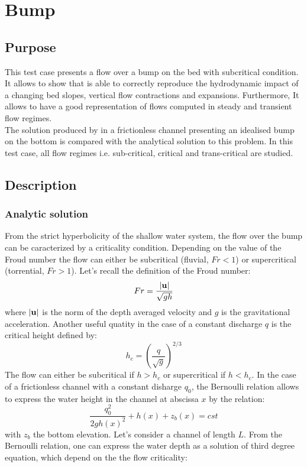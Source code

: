 \chapter{Bump}\label{chapter:bump}

\section{Purpose}

This test case presents a flow over a bump on the bed with subcritical condition.
It allows to show that  is able to correctly reproduce
the hydrodynamic impact of a changing bed slopes, vertical flow
contractions and expansions. Furthermore, It allows to have a good
representation of flows computed in steady and transient flow regimes. \\

The solution produced by  in a frictionless channel
presenting an idealised bump on the bottom  is compared with
the analytical solution to this problem. In this test case,
all flow regimes i.e. sub-critical, critical and trans-critical are studied.

\section{Description}

\subsection{Analytic solution}

From the strict hyperbolicity of the shallow water system, the flow over the bump can be caracterized by a
criticality condition. Depending on the value of the Froud number 
the flow can either be subcritical (fluvial, $Fr<1$) 
or supercritical (torrential, $Fr>1$).
Let's recall the definition of the Froud number:
\begin{equation}
Fr = \dfrac{|{\bf u}|}{\sqrt{gh}}
\end{equation}
where $|{\bf u}|$ is the norm of the depth averaged velocity and $g$ is the gravitational acceleration. Another useful quatity in the case of a constant discharge $q$ is the critical height defined by:
\begin{equation}
h_c = \left( \dfrac{q}{\sqrt{g}}\right)^{2/3}
\end{equation}
The flow can either be subcritical if $h>h_c$ or supercritical if $h<h_c$.
In the case of a frictionless channel with a constant disharge $q_0$, the Bernoulli relation allows to express the water height in the channel at abscissa $x$ by the relation:
\begin{equation}
\dfrac{q_0^2}{2 g h(x)^2} + h(x) + z_b(x) = cst
\end{equation}
with $z_b$ the bottom elevation. Let's consider a channel of length $L$.
From the Bernoulli relation, one can express the water depth as a solution of third degree equation, which depend on the
the flow criticality:

